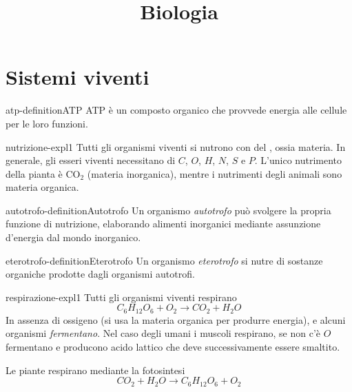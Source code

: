 \documentclass[preview]{standalone}
\begin{document}
\title{Biologia}
\genpage

\section{Sistemi viventi}

\begin{snippetdefinition}{atp-definition}{ATP}
    ATP è un composto organico che provvede energia alle cellule per le loro funzioni.
\end{snippetdefinition}



\begin{snippet}{nutrizione-expl1}
Tutti gli organismi viventi si nutrono con del , ossia materia.
In generale, gli esseri viventi necessitano di \(C\), \(O\), \(H\), \(N\), \(S\) e \(P\).
L'unico nutrimento della pianta è CO\({}_2\) (materia inorganica), mentre
i nutrimenti degli animali sono materia organica.
\end{snippet}

\begin{snippetdefinition}{autotrofo-definition}{Autotrofo}
    Un organismo \textit{autotrofo} può svolgere la propria funzione di nutrizione,
    elaborando alimenti inorganici mediante assunzione d'energia dal mondo inorganico.
\end{snippetdefinition}

\begin{snippetdefinition}{eterotrofo-definition}{Eterotrofo}
    Un organismo \textit{eterotrofo}
    si nutre di sostanze organiche prodotte dagli organismi autotrofi.
\end{snippetdefinition}


\begin{snippet}{respirazione-expl1}
Tutti gli organismi viventi respirano
\[
    C_6H_{12}O_6 + O_2 \rightarrow CO_2 + H_2O
\]
In assenza di ossigeno (si usa la materia organica per produrre energia), e alcuni organismi \textit{fermentano}.
Nel caso degli umani i muscoli respirano, se non c'è \(O\) fermentano e producono acido lattico
che deve successivamente essere smaltito.

Le piante respirano mediante la fotosintesi
\[
    CO_2 + H_2O \rightarrow C_6H_{12}O_6 + O_2
\]
\end{snippet}
\end{document}
